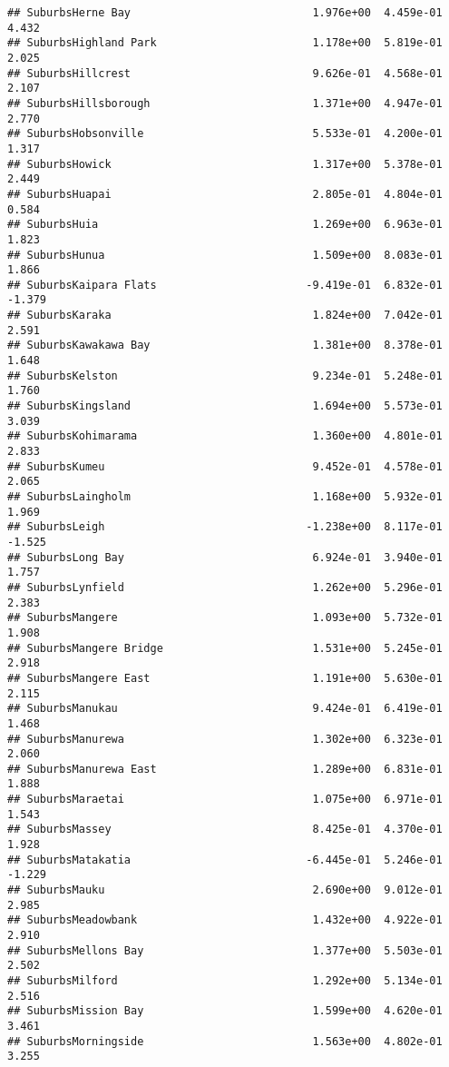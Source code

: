 \documentclass[
]{article}
\begin{document}
\begin{verbatim}
## SuburbsHerne Bay                            1.976e+00  4.459e-01   4.432
## SuburbsHighland Park                        1.178e+00  5.819e-01   2.025
## SuburbsHillcrest                            9.626e-01  4.568e-01   2.107
## SuburbsHillsborough                         1.371e+00  4.947e-01   2.770
## SuburbsHobsonville                          5.533e-01  4.200e-01   1.317
## SuburbsHowick                               1.317e+00  5.378e-01   2.449
## SuburbsHuapai                               2.805e-01  4.804e-01   0.584
## SuburbsHuia                                 1.269e+00  6.963e-01   1.823
## SuburbsHunua                                1.509e+00  8.083e-01   1.866
## SuburbsKaipara Flats                       -9.419e-01  6.832e-01  -1.379
## SuburbsKaraka                               1.824e+00  7.042e-01   2.591
## SuburbsKawakawa Bay                         1.381e+00  8.378e-01   1.648
## SuburbsKelston                              9.234e-01  5.248e-01   1.760
## SuburbsKingsland                            1.694e+00  5.573e-01   3.039
## SuburbsKohimarama                           1.360e+00  4.801e-01   2.833
## SuburbsKumeu                                9.452e-01  4.578e-01   2.065
## SuburbsLaingholm                            1.168e+00  5.932e-01   1.969
## SuburbsLeigh                               -1.238e+00  8.117e-01  -1.525
## SuburbsLong Bay                             6.924e-01  3.940e-01   1.757
## SuburbsLynfield                             1.262e+00  5.296e-01   2.383
## SuburbsMangere                              1.093e+00  5.732e-01   1.908
## SuburbsMangere Bridge                       1.531e+00  5.245e-01   2.918
## SuburbsMangere East                         1.191e+00  5.630e-01   2.115
## SuburbsManukau                              9.424e-01  6.419e-01   1.468
## SuburbsManurewa                             1.302e+00  6.323e-01   2.060
## SuburbsManurewa East                        1.289e+00  6.831e-01   1.888
## SuburbsMaraetai                             1.075e+00  6.971e-01   1.543
## SuburbsMassey                               8.425e-01  4.370e-01   1.928
## SuburbsMatakatia                           -6.445e-01  5.246e-01  -1.229
## SuburbsMauku                                2.690e+00  9.012e-01   2.985
## SuburbsMeadowbank                           1.432e+00  4.922e-01   2.910
## SuburbsMellons Bay                          1.377e+00  5.503e-01   2.502
## SuburbsMilford                              1.292e+00  5.134e-01   2.516
## SuburbsMission Bay                          1.599e+00  4.620e-01   3.461
## SuburbsMorningside                          1.563e+00  4.802e-01   3.255

\end{verbatim}
\end{document}
